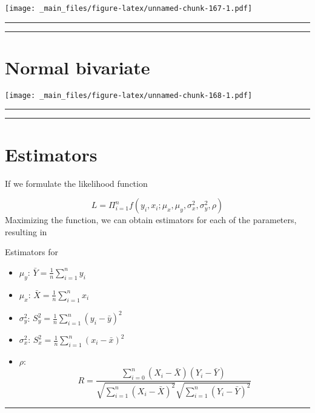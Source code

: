 \documentclass[
]{book}
\providecommand{\tightlist}{%
  \setlength{\itemsep}{0pt}\setlength{\parskip}{0pt}}
\begin{document}
\texttt{[image: \_main\_files/figure-latex/unnamed-chunk-167-1.pdf]}

\begin{center}\rule{0.5\linewidth}{0.5pt}\end{center}

\begin{center}\rule{0.5\linewidth}{0.5pt}\end{center}

\hypertarget{normal-bivariate-2}{%
\section{Normal bivariate}\label{normal-bivariate-2}}

\texttt{[image: \_main\_files/figure-latex/unnamed-chunk-168-1.pdf]}

\begin{center}\rule{0.5\linewidth}{0.5pt}\end{center}

\begin{center}\rule{0.5\linewidth}{0.5pt}\end{center}

\hypertarget{estimators}{%
\section{Estimators}\label{estimators}}

If we formulate the likelihood function

\[L=\Pi_{i=1}^n f(y_i,x_i; \mu_x, \mu_y, \sigma^2_x, \sigma_y^2, \rho)\]
Maximizing the function, we can obtain estimators for each of the parameters, resulting in

Estimators for

\begin{itemize}
\tightlist
\item
  \(\mu_y\): \(\bar{Y}=\frac{1}{n}\sum_{i=1}^n y_i\)
\item
  \(\mu_x\): \(\bar{X}=\frac{1}{n}\sum_{i=1}^n x_i\)
\item
  \(\sigma^2_y\): \(S^2_y=\frac{1}{n}\sum_{i=1}^n (y_i-\bar{y})^2\)
\item
  \(\sigma^2_x\): \(S^2_x=\frac{1}{n}\sum_{i=1}^n (x_i-\bar{x})^2\)
\item
  \(\rho\): \[R=\frac{\sum_{i=0}^n(X_i-\bar{X})(Y_i-\bar{Y})}{\sqrt{\sum_{i=1}^n(X_i-\bar{X})^2}\sqrt{\sum_{i=1}^n(Y_i-\bar{Y})^2}}\]
\end{itemize}

\begin{center}\rule{0.5\linewidth}{0.5pt}\end{center}
\end{document}
